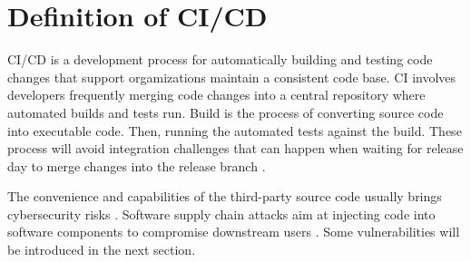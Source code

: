 \section{Definition of CI/CD}

CI/CD is a development process for automatically building and testing code changes 
that support orgamizations maintain a consistent code base. CI involves developers
frequently merging code changes into a central repository where automated builds
and tests run. Build is the process of converting source code into executable 
code. Then, running the automated tests against the build. These process will avoid
integration challenges that can happen when waiting for release day to merge changes into the
release branch \cite{DoDDefCI/CD2023}. 


The convenience and capabilities of the third-party source code usually 
brings cybersecurity risks \cite{mastrangelo2015use}. Software supply 
chain attacks aim at injecting code into software components to compromise
downstream users \cite{ladisa2023sok}. Some vulnerabilities will be introduced 
in the next section.